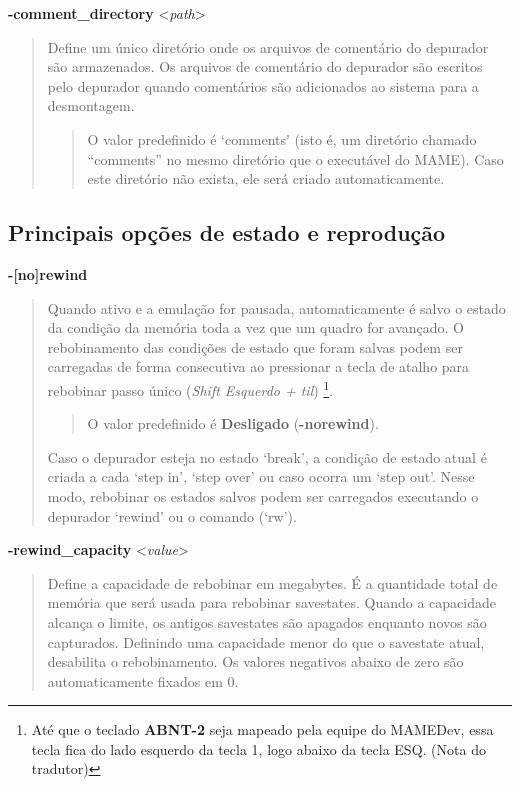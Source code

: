 \documentclass[letterpaper,10pt,brazil]{sphinxmanual}
\begin{document}
\textbf{-comment\_directory} \textless{}\emph{path}\textgreater{}
\begin{quote}

Define um único diretório onde os arquivos de comentário do
depurador são armazenados. Os arquivos de comentário do depurador
são escritos pelo depurador quando comentários são adicionados ao
sistema para a desmontagem.
\begin{quote}

O valor predefinido é `comments' (isto é, um diretório chamado
``comments'' no mesmo diretório que o executável do MAME). Caso este
diretório não exista, ele será criado automaticamente.
\end{quote}
\end{quote}


\subsection{Principais opções de estado e reprodução}
\label{commandline/commandline-all:principais-opcoes-de-estado-e-reproducao}\label{commandline/commandline-all:mame-commandline-norewind}
\textbf{-{[}no{]}rewind}
\begin{quote}

Quando ativo e a emulação for pausada, automaticamente é salvo o
estado da condição da memória toda a vez que um quadro for avançado.
O rebobinamento das condições de estado que foram salvas podem ser
carregadas de forma consecutiva ao pressionar a tecla de atalho para
rebobinar passo único (\emph{Shift Esquerdo + til}) \footnote[3]{\sphinxAtStartFootnote%
Até que o teclado \textbf{ABNT-2} seja mapeado pela equipe do MAMEDev,
essa tecla fica do lado esquerdo da tecla 1, logo abaixo da
tecla ESQ. (Nota do tradutor)
}.
\begin{quote}

O valor predefinido é \textbf{Desligado} (\textbf{-norewind}).
\end{quote}

Caso o depurador esteja no estado `break', a condição de estado
atual é criada a cada `step in', `step over' ou caso ocorra um
`step out'. Nesse modo, rebobinar os estados salvos podem ser
carregados executando o depurador `rewind' ou o comando (`rw').
\end{quote}
\label{commandline/commandline-all:mame-commandline-rewindcapacity}
\textbf{-rewind\_capacity} \textless{}\emph{value}\textgreater{}
\begin{quote}

Define a capacidade de rebobinar em megabytes.
É a quantidade total de memória que será usada para rebobinar
savestates. Quando a capacidade alcança o limite, os antigos
savestates são apagados enquanto novos são capturados. Definindo uma
capacidade menor do que o savestate atual, desabilita o
rebobinamento. Os valores negativos abaixo de zero são
automaticamente fixados em 0.
\end{quote}
\end{document}
